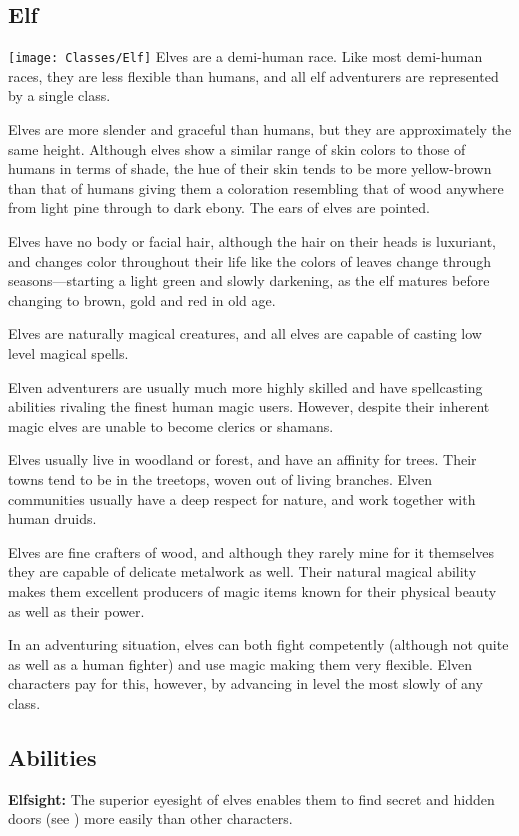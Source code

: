 \begin{multicols*}{2}

\section{Elf}\label{class:Elf}
\texttt{[image: Classes/Elf]}
Elves are a demi-human race. Like most demi-human races, they are less flexible than humans, and all elf adventurers are represented by a single class.

Elves are more slender and graceful than humans, but they are approximately the same height. Although elves show a similar range of skin colors to those of humans in terms of shade, the hue of their skin tends to be more yellow-brown than that of humans giving them a coloration resembling that of wood anywhere from light pine through to dark ebony. The ears of elves are pointed.

Elves have no body or facial hair, although the hair on their heads is luxuriant, and changes color throughout their life like the colors of leaves change through seasons—starting a light green and slowly darkening, as the elf matures before changing to brown, gold and red in old age.

Elves are naturally magical creatures, and all elves are capable of casting low level magical spells.

Elven adventurers are usually much more highly skilled and have spellcasting abilities rivaling the finest human magic users. However, despite their inherent magic elves are unable to become clerics or shamans.

Elves usually live in woodland or forest, and have an affinity for trees. Their towns tend to be in the treetops, woven out of living branches. Elven communities usually have a deep respect for nature, and work together with human druids.

Elves are fine crafters of wood, and although they rarely mine for it themselves they are capable of delicate metalwork as well. Their natural magical ability makes them excellent producers of magic items known for their physical beauty as well as their power.

In an adventuring situation, elves can both fight competently (although not quite as well as a human fighter) and use magic making them very flexible. Elven characters pay for this, however, by advancing in level the most slowly of any class.

\subsection{Abilities}
\textbf{Elfsight:} The superior eyesight of elves enables them to find secret and hidden doors (see ) more easily than other characters.


\end{multicols*}
